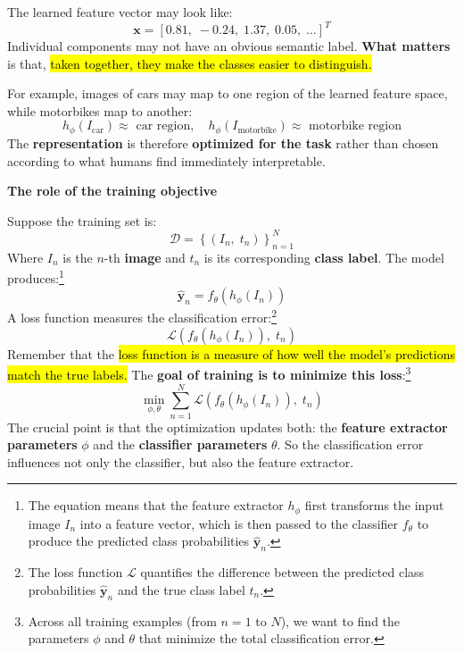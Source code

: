 \highspace
The learned feature vector may look like:
\begin{equation*}
    \mathbf{x} = \left[0.81, \; -0.24, \; 1.37, \; 0.05, \; \dots \right]^{T}
\end{equation*}
Individual components may not have an obvious semantic label. \textbf{What matters} is that, \hl{taken together, they make the classes easier to distinguish.}

\highspace
For example, images of cars may map to one region of the learned feature space, while motorbikes map to another:
\begin{equation*}
    h_{\phi}\left(I_{\text{car}}\right) \approx \text{ car region}, \quad h_{\phi}\left(I_{\text{motorbike}}\right) \approx \text{ motorbike region}
\end{equation*}
The \textbf{representation} is therefore \textbf{optimized for the task} rather than chosen according to what humans find immediately interpretable.

\highspace
\begin{flushleft}
    \textcolor{Green3}{ \textbf{The role of the training objective}}
\end{flushleft}
Suppose the training set is:
\begin{equation*}
    \mathcal{D} = \left\{\left(I_{n}, \; t_{n}\right)\right\}^{N}_{n=1}
\end{equation*}
Where $I_{n}$ is the $n$-th \textbf{image} and $t_{n}$ is its corresponding \textbf{class label}. The model produces:\footnote{%
    The equation means that the feature extractor $h_{\phi}$ first transforms the input image $I_{n}$ into a feature vector, which is then passed to the classifier $f_{\theta}$ to produce the predicted class probabilities $\hat{\mathbf{y}}_{n}$.
}
\begin{equation*}
    \hat{\mathbf{y}}_{n} = f_{\theta}\left(h_{\phi}\left(I_{n}\right)\right)
\end{equation*}
A loss function measures the classification error:\footnote{%
    The loss function $\mathcal{L}$ quantifies the difference between the predicted class probabilities $\hat{\mathbf{y}}_{n}$ and the true class label $t_{n}$.
}
\begin{equation*}
    \mathcal{L}\left(
        f_{\theta}\left(h_{\phi}\left(I_{n}\right)\right), \; t_{n}
    \right)
\end{equation*}
Remember that the \hl{loss function is a measure of how well the model's predictions match the true labels.} The \textbf{goal of training is to minimize this loss}:\footnote{%
    Across all training examples (from $n=1$ to $N$), we want to find the parameters $\phi$ and $\theta$ that minimize the total classification error.
}
\begin{equation*}
    \displaystyle\min_{\phi,\theta}\sum_{n=1}^{N} \mathcal{L}\left(
        f_{\theta}\left(h_{\phi}\left(I_{n}\right)\right), \; t_{n}
    \right)
\end{equation*}
The crucial point is that the optimization updates both: the \textbf{feature extractor parameters} $\phi$ and the \textbf{classifier parameters} $\theta$. So the classification error influences not only the classifier, but also the feature extractor.

